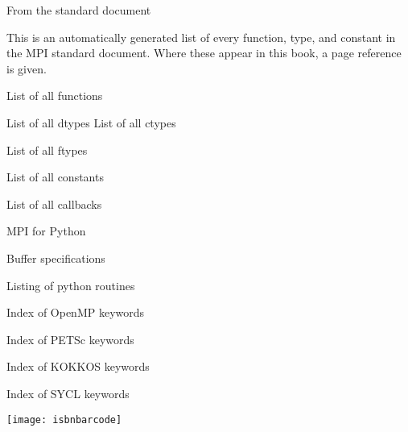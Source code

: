 \documentclass[11pt,letterpaper,twoside,openany]{boek3}
\begin{document}
 {From the standard document}

This is an automatically generated list of every
function, type, and constant in the MPI standard document.
Where these appear in this book, a page reference is given.

 {List of all functions}

 {List of all dtypes}
%
 {List of all ctypes}

 {List of all ftypes}

 {List of all constants}

 {List of all callbacks}


 {MPI for Python}

 {Buffer specifications}

{\small
  
  
  
  
}

 {Listing of python routines}

\begin{multicols}{3}
\small
{}




\end{multicols}

 {Index of OpenMP keywords}

\begin{multicols*}{2}
\printindex[omp]
\end{multicols*}

 {Index of PETSc keywords}

\begin{multicols*}{2}
\printindex[petsc]
\end{multicols*}

 {Index of KOKKOS keywords}

\begin{multicols*}{2}
\printindex[kokkos]
\end{multicols*}

 {Index of SYCL keywords}

\begin{multicols*}{2}
\printindex[sycl]
\end{multicols*}

\hbox{}\vfill
\texttt{[image: isbnbarcode]}

\closeout\chapterlist
\end{document}
